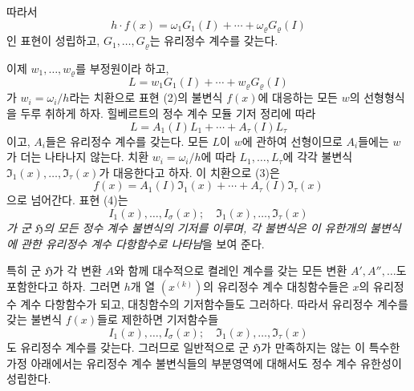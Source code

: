 따라서
\begin{equation}
\tag{2}
h\cdot f(x)=\omega_1G_1(I)+\cdots+\omega_\varrho G_\varrho(I)
\end{equation}
인 표현이 성립하고, \(G_1,\ldots,G_\varrho\)는 유리정수 계수를 갖는다.

이제 \(w_1,\ldots,w_\varrho\)를 부정원이라 하고,
\[
L=w_1G_1(I)+\cdots+w_\varrho G_\varrho(I)
\]
가 \(w_i=\omega_i/h\)라는 치환으로 표현 (2)의 불변식 \(f(x)\)에 대응하는 모든 \(w\)의 선형형식을 두루 취하게 하자. 힐베르트의 정수 계수 모듈 기저 정리에 따라
\begin{equation}
\tag{3}
L=A_1(I)L_1+\cdots+A_\tau(I)L_\tau
\end{equation}
이고, \(A_i\)들은 유리정수 계수를 갖는다. 모든 \(L\)이 \(w\)에 관하여 선형이므로 \(A_i\)들에는 \(w\)가 더는 나타나지 않는다. 치환 \(w_i=\omega_i/h\)에 따라 \(L_1,\ldots,L_\tau\)에 각각 불변식 \(\mathfrak I_1(x),\ldots,\mathfrak I_\tau(x)\)가 대응한다고 하자. 이 치환으로 (3)은
\begin{equation}
\tag{4}
f(x)=A_1(I)\mathfrak I_1(x)+\cdots+
A_\tau(I)\mathfrak I_\tau(x)
\end{equation}
으로 넘어간다. 표현 (4)는
\[
I_1(x),\ldots,I_\sigma(x);
\quad\mathfrak I_1(x),\ldots,\mathfrak I_\tau(x)
\]
\emph{가 군 \(\mathfrak H\)의 모든 정수 계수 불변식의 기저를 이루며, 각 불변식은 이 유한개의 불변식에 관한 유리정수 계수 다항함수로 나타남}을 보여 준다.

특히 군 \(\mathfrak H\)가 각 변환 \(A\)와 함께 대수적으로 켤레인 계수를 갖는 모든 변환 \(A',A'',\ldots\)도 포함한다고 하자. 그러면 \(h\)개 열 \((x^{(k)})\)의 유리정수 계수 대칭함수들은 \(x\)의 유리정수 계수 다항함수가 되고, 대칭함수의 기저함수들도 그러하다. 따라서 유리정수 계수를 갖는 불변식 \(f(x)\)들로 제한하면 기저함수들
\[
I_1(x),\ldots,I_\sigma(x);
\quad\mathfrak I_1(x),\ldots,\mathfrak I_\tau(x)
\]
도 유리정수 계수를 갖는다. 그러므로 일반적으로 군 \(\mathfrak H\)가 만족하지는 않는 이 특수한 가정 아래에서는 유리정수 계수 불변식들의 부분영역에 대해서도 정수 계수 유한성이 성립한다.
